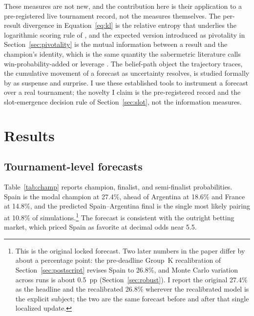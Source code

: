 \documentclass[11pt,letterpaper]{article}
\begin{document}
These measures are not new, and the contribution here is their application to a pre-registered live tournament record, not the measures themselves. The per-result divergence in Equation~\eqref{eq:kl} is the relative entropy that underlies the logarithmic scoring rule of \citet{gneiting2007}, and the expected version introduced as pivotality in Section~\ref{sec:pivotality} is the mutual information between a result and the champion's identity, which is the same quantity the sabermetric literature calls win-probability-added or leverage \citep{tango2007}. The belief-path object the trajectory traces, the cumulative movement of a forecast as uncertainty resolves, is studied formally by \citet{ely2015} as suspense and surprise. I use these established tools to instrument a forecast over a real tournament; the novelty I claim is the pre-registered record and the slot-emergence decision rule of Section~\ref{sec:slot}, not the information measures.

\section{Results}

\subsection{Tournament-level forecasts}

Table~\ref{tab:champ} reports champion, finalist, and semi-finalist probabilities. Spain is the modal champion at 27.4\%, ahead of Argentina at 18.6\% and France at 14.8\%, and the predicted Spain--Argentina final is the single most likely pairing at 10.8\% of simulations.\footnote{This is the original locked forecast. Two later numbers in the paper differ by about a percentage point: the pre-deadline Group~K recalibration of Section~\ref{sec:postscript} revises Spain to 26.8\%, and Monte Carlo variation across runs is about 0.5~pp (Section~\ref{sec:robust}). I report the original 27.4\% as the headline and the recalibrated 26.8\% wherever the recalibrated model is the explicit subject; the two are the same forecast before and after that single localized update.} The forecast is consistent with the outright betting market, which priced Spain as favorite at decimal odds near 5.5.
\end{document}
